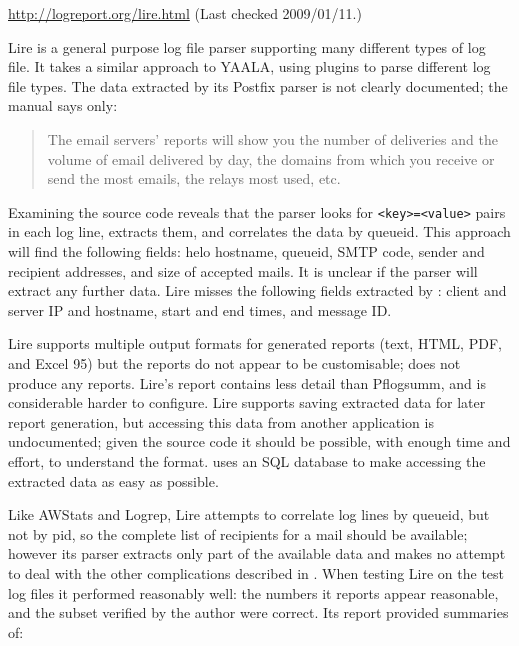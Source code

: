 \noindent{}\url{http://logreport.org/lire.html} \newline{}
(Last checked 2009/01/11.)

Lire is a general purpose log file parser supporting many different types
of log file.  It takes a similar approach to YAALA, using plugins to parse
different log file types.  The data extracted by its Postfix parser is not
clearly documented; the manual says only:

\begin{quotation}

    The email servers' reports will show you the number of deliveries and
    the volume of email delivered by day, the domains from which you
    receive or send the most emails, the relays most used, etc.

\end{quotation}

\noindent{}Examining the source code reveals that the parser looks for
\texttt{<key>=<value>} pairs in each log line, extracts them, and
correlates the data by queueid.  This approach will find the following
fields: helo hostname, queueid, \gls{SMTP} code, sender and recipient
addresses, and size of accepted mails.  It is unclear if the parser will
extract any further data.  Lire misses the following fields extracted by
\parsername{}: client and server \gls{IP} and hostname, start and end
times, and message ID\@. 

Lire supports multiple output formats for generated reports (text, HTML,
PDF, and Excel 95) but the reports do not appear to be customisable;
\parsername{} does not produce any reports.  Lire's report contains less
detail than Pflogsumm, and is considerable harder to configure.  Lire
supports saving extracted data for later report generation, but accessing
this data from another application is undocumented; given the source code
it should be possible, with enough time and effort, to understand the
format.  \parsername{} uses an \gls{SQL} database to make accessing the
extracted data as easy as possible.  

Like AWStats and Logrep, Lire attempts to correlate log lines by queueid,
but not by \gls{pid}, so the complete list of recipients for a mail should
be available; however its parser extracts only part of the available data
and makes no attempt to deal with the other complications described in
.  When testing Lire on the \numberOFlogFILES{}
test log files it performed reasonably well: the numbers it reports appear
reasonable, and the subset verified by the author were correct.  Its report
provided summaries of: 

